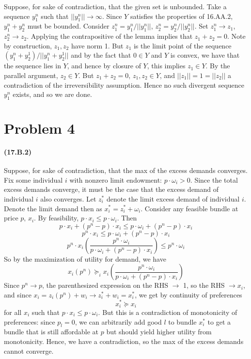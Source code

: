 \documentclass[10pt,letter]{article}
\begin{document}
Suppose, for sake of contradiction, that the given set is unbounded. Take a sequence $y_1^n$ such that $|| y_1^n || \to \infty$. Since $Y$ satisfies the properties of 16.AA.2, $y_1^n + y_2^n$ must be bounded. Consider $z_1^n = y_1^n/||y_1^n||$, $z_2^n = y_2^n/||y_2^n||$. Set $z_1^n \to z_1$, $z_2^n \to z_2$. Applying the contrapositive of the lemma implies that $z_1 + z_2 = 0$. Note by construction, $z_1, z_2$ have norm 1.
But $z_1$ is the limit point of the sequence $(y_1^n + y_2^1) /||y_1^n + y_2^1|| $ and by the fact that $0 \in Y$ and $Y$ is convex, we have that the sequence lies in $Y$, and hence by closure of $Y$, this implies $z_1 \in Y$. By the parallel argument, $z_2 \in Y$. But $z_1 + z_2 = 0$, $z_1, z_2 \in Y$, and $||z_1|| = 1 = ||z_2||$ a contradiction of the irreversibility assumption. Hence no such divergent sequence $y_1^n$ exists, and so we are done.
\section*{Problem 4}
\paragraph{(17.B.2)}
Suppose, for sake of contradiction, that the max of the excess demands converges. Fix some individual $i$ with nonzero limit endowment: $p \cdot \omega_i > 0$. Since the total excess demands converge, it must be the case that the excess demand of individual $i$ also converges. Let $z^*_i$ denote the limit excess demand of individual $i$. Denote the limit demand then as $x^*_i = z^*_i + \omega_i$. Consider any feasible bundle at price $p$, $x_i$. By feasibility, $p \cdot x_i \le p \cdot \omega_i$. Then
\[ p \cdot x_i + (p^n - p)\cdot x_i \le p \cdot \omega_i + (p^n-p) \cdot x_i \]
\[ p^n \cdot x_i \le p \cdot \omega_i + (p^n-p) \cdot x_i \]
\[ p^n \cdot x_i\left(\frac{p^n \cdot \omega_i}{p \cdot \omega_i + (p^n-p) \cdot x_i} \right) \le p^n \cdot \omega_i \]
So by the maximization of utility for demand, we have
\[ x_i(p^n) \succeq_i x_i \left(\frac{p^n \cdot \omega_i}{p \cdot \omega_i + (p^n-p) \cdot x_i} \right) \]
Since $p^n \to p$, the parenthesized expression on the RHS $\to$ 1, so the RHS $\to x_i$, and since $x_i = z_i(p^n) + w_i \to z^*_i + w_i = x^*_i$, we get by continuity of preferences
\[ x^*_i \succeq x_i \]
for all $x_i$ such that $p \cdot x_i \le p \cdot \omega_i$. But this is a contradiction of monotonicity of preferences: since $p_l = 0$, we can arbitrarily add good $l$ to bundle $x^*_i$ to get a bundle that is still affordable at $p$ but should yield higher utility from monotonicity. Hence, we have a contradiction, so the max of the excess demands cannot converge.
\end{document}
